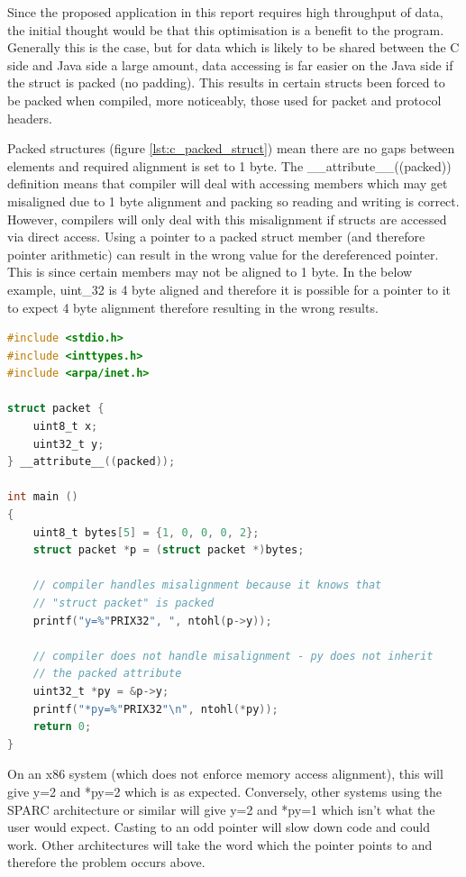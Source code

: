 \documentclass[final_report.tex]{subfiles}
\begin{document}
Since the proposed application in this report requires high throughput of data, the initial thought would be that this optimisation is a benefit to the program. Generally this is the case, but for data which is likely to be shared between the C side and Java side a large amount, data accessing is far easier on the Java side if the struct is packed (no padding). This results in certain structs been forced to be packed when compiled, more noticeably, those used for packet and protocol headers.

Packed structures (figure \ref{lst:c_packed_struct}) mean there are no gaps between elements and required alignment is set to 1 byte. The \_\_attribute\_\_((packed)) definition means that compiler will deal with accessing members which may get misaligned due to 1 byte alignment and packing so reading and writing is correct. However, compilers will only deal with this misalignment if structs are accessed via direct access. Using a pointer to a packed struct member (and therefore pointer arithmetic) can result in the wrong value for the dereferenced pointer. This is since certain members may not be aligned to 1 byte. In the below example, uint\_32 is 4 byte aligned and therefore it is possible for a pointer to it to expect 4 byte alignment therefore resulting in the wrong results.

\begin{lstlisting}[language=C, caption={Example C Struct with compiler inserted padding}, label=lst:c_padded_struct]
#include <stdio.h>
#include <inttypes.h>
#include <arpa/inet.h>

struct packet {
    uint8_t x;
    uint32_t y;
} __attribute__((packed));

int main ()
{
    uint8_t bytes[5] = {1, 0, 0, 0, 2};
    struct packet *p = (struct packet *)bytes;

    // compiler handles misalignment because it knows that
    // "struct packet" is packed
    printf("y=%"PRIX32", ", ntohl(p->y));

    // compiler does not handle misalignment - py does not inherit
    // the packed attribute
    uint32_t *py = &p->y;
    printf("*py=%"PRIX32"\n", ntohl(*py));
    return 0;
}
\end{lstlisting}

On an x86 system (which does not enforce memory access alignment), this will give y=2 and *py=2 which is as expected. Conversely, other systems using the SPARC architecture or similar will give y=2 and *py=1 which isn't what the user would expect. Casting to an odd pointer will slow down code and could work. Other architectures will take the word which the pointer points to and therefore the problem occurs above.
\end{document}
